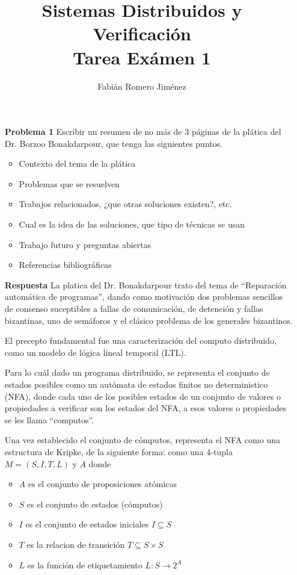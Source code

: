 \documentclass{article}
\title{Sistemas Distribuidos y Verificación \\ Tarea Exámen 1}
\author{Fabián Romero Jiménez}
\begin{document}
\date {}
\maketitle

\begin{enumerate}

\item[\bf{Problema 1}] Escribir un resumen de no más de 3 páginas de la plática del Dr. Borzoo Bonakdarpour, que tenga las siguientes puntos.
\begin{itemize}
\item Contexto del tema de la plática
\item Problemas que se resuelven
\item Trabajos relacionados, ¿que otras soluciones existen?, etc.
\item Cual es la idea de las soluciones, que tipo de técnicas se usan
\item Trabajo futuro y preguntas abiertas
\item Referencias bibliográficas
\end{itemize}

\item[\bf{Respuesta}]
La platica del Dr. Bonakdarpour trato del tema de ``Reparación automática de programas'', dando como motivación dos problemas sencillos de consenso suceptibles a fallas de comunicación, de detención y fallas bizantinas, uno de semáforos y el clásico problema de los generales bizantinos. 

El precepto fundamental fue una caracterización del computo distribuido, como un modelo de lógica lineal temporal (LTL).

Para lo cuál dado un programa distribuido, se representa el conjunto de estados posibles como un autómata de estados finitos no deterministico (NFA), donde cada uno de los posibles estados de un conjunto de valores o propiedades a verificar son los estados del NFA, a esos valores o propiedades se les llama ``computos''.

Una vez establecido el conjunto de cómputos, representa el NFA como una estructura de Kripke, de la siguiente forma:
como una 4-tupla $M=(S,I,T,L)$ y $A$ donde 
\begin{itemize}
\item $A$ es el conjunto de proposiciones atómicas
\item $S$ es el conjunto de estados (cómputos)
\item $I$ es el conjunto de estados iniciales $I \subseteq S$
\item $T$ es la relacion de transición $T \subseteq S \times S$
\item $L$ es la función de etiquetamiento $L: S \rightarrow 2^A$
\end{itemize}


\end{enumerate}
\end{document}
